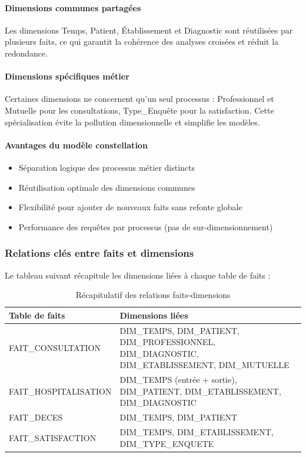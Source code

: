 \documentclass[12pt,a4paper]{article}
\begin{document}
\paragraph{Dimensions communes partagées}
Les dimensions Temps, Patient, Établissement et Diagnostic sont réutilisées par plusieurs faits, ce qui garantit la cohérence des analyses croisées et réduit la redondance.

\paragraph{Dimensions spécifiques métier}
Certaines dimensions ne concernent qu'un seul processus : Professionnel et Mutuelle pour les consultations, Type\_Enquête pour la satisfaction. Cette spécialisation évite la pollution dimensionnelle et simplifie les modèles.

\paragraph{Avantages du modèle constellation}
\begin{itemize}[leftmargin=*]
    \item Séparation logique des processus métier distincts
    \item Réutilisation optimale des dimensions communes
    \item Flexibilité pour ajouter de nouveaux faits sans refonte globale
    \item Performance des requêtes par processus (pas de sur-dimensionnement)
\end{itemize}

\subsubsection{Relations clés entre faits et dimensions}

Le tableau suivant récapitule les dimensions liées à chaque table de faits :

\begin{table}[H]
\centering
\caption{Récapitulatif des relations faits-dimensions}
\begin{tabularx}{\textwidth}{|l|X|}
\hline
\textbf{Table de faits} & \textbf{Dimensions liées} \\
\hline
FAIT\_CONSULTATION & DIM\_TEMPS, DIM\_PATIENT, DIM\_PROFESSIONNEL, DIM\_DIAGNOSTIC, DIM\_ETABLISSEMENT, DIM\_MUTUELLE \\
\hline
FAIT\_HOSPITALISATION & DIM\_TEMPS (entrée + sortie), DIM\_PATIENT, DIM\_ETABLISSEMENT, DIM\_DIAGNOSTIC \\
\hline
FAIT\_DECES & DIM\_TEMPS, DIM\_PATIENT \\
\hline
FAIT\_SATISFACTION & DIM\_TEMPS, DIM\_ETABLISSEMENT, DIM\_TYPE\_ENQUETE \\
\hline
\end{tabularx}
\end{table}
\end{document}
